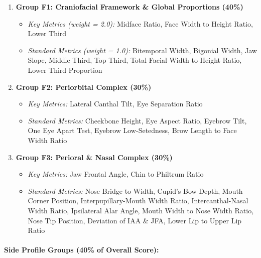 \begin{enumerate}
    \item \textbf{Group F1: Craniofacial Framework \& Global Proportions (40\%)}
    \begin{itemize}
        \item \textit{Key Metrics (weight = 2.0):} Midface Ratio, Face Width to Height Ratio, Lower Third
        \item \textit{Standard Metrics (weight = 1.0):} Bitemporal Width, Bigonial Width, Jaw Slope, Middle Third, Top Third, Total Facial Width to Height Ratio, Lower Third Proportion
    \end{itemize}
    
    \item \textbf{Group F2: Periorbital Complex (30\%)}
    \begin{itemize}
        \item \textit{Key Metrics:} Lateral Canthal Tilt, Eye Separation Ratio
        \item \textit{Standard Metrics:} Cheekbone Height, Eye Aspect Ratio, Eyebrow Tilt, One Eye Apart Test, Eyebrow Low-Setedness, Brow Length to Face Width Ratio
    \end{itemize}
    
    \item \textbf{Group F3: Perioral \& Nasal Complex (30\%)}
    \begin{itemize}
        \item \textit{Key Metrics:} Jaw Frontal Angle, Chin to Philtrum Ratio
        \item \textit{Standard Metrics:} Nose Bridge to Width, Cupid's Bow Depth, Mouth Corner Position, Interpupillary-Mouth Width Ratio, Intercanthal-Nasal Width Ratio, Ipsilateral Alar Angle, Mouth Width to Nose Width Ratio, Nose Tip Position, Deviation of IAA \& JFA, Lower Lip to Upper Lip Ratio
    \end{itemize}
\end{enumerate}

\paragraph{Side Profile Groups (40\% of Overall Score):}

